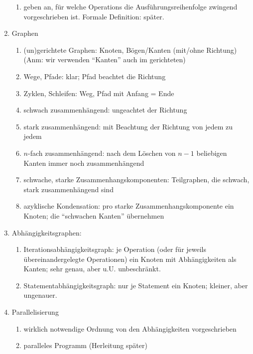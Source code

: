 \begin{enumerate}
\begin{enumerate}
  \item geben an, für welche Operations die Ausführungsreihenfolge
    zwingend vorgeschrieben ist. Formale Definition: später.
  \end{enumerate}
\item Graphen
  \begin{enumerate}
  \item (un)gerichtete Graphen: Knoten, Bögen/Kanten (mit/ohne Richtung)
    (Anm: wir verwenden ``Kanten'' auch im gerichteten)
  \item Wege, Pfade: klar; Pfad beachtet die Richtung
  \item Zyklen, Schleifen: Weg, Pfad mit Anfang = Ende
  \item schwach zusammenhängend: ungeachtet der Richtung
  \item stark zusammenhängend: mit Beachtung der Richtung von jedem zu
    jedem
  \item $n$-fach zusammenhängend: nach dem Löschen von $n\!-\!1$ beliebigen
    Kanten immer noch zusammenhängend
  \item schwache, starke Zusammenhangskomponenten: Teilgraphen, die
    schwach, stark zusammenhängend sind
  \item azyklische Kondensation: pro starke Zusammenhangskomponente ein
    Knoten; die ``schwachen Kanten'' übernehmen
  \end{enumerate}
\item Abhängigkeitsgraphen:
  \begin{enumerate}
  \item Iterationsabhängigkeitsgraph: je Operation (oder für jeweils
    übereinandergelegte Operationen) ein Knoten mit Abhängigkeiten als
    Kanten; sehr genau, aber u.U. unbeschränkt.
  \item Statementabhängigkeitsgraph: nur je Statement ein Knoten;
    kleiner, aber ungenauer.
  \end{enumerate}
\item Parallelisierung
  \begin{enumerate}
  \item wirklich notwendige Ordnung von den Abhängigkeiten vorgeschrieben
  \item paralleles Programm (Herleitung später)
  \end{enumerate}
\end{enumerate}




